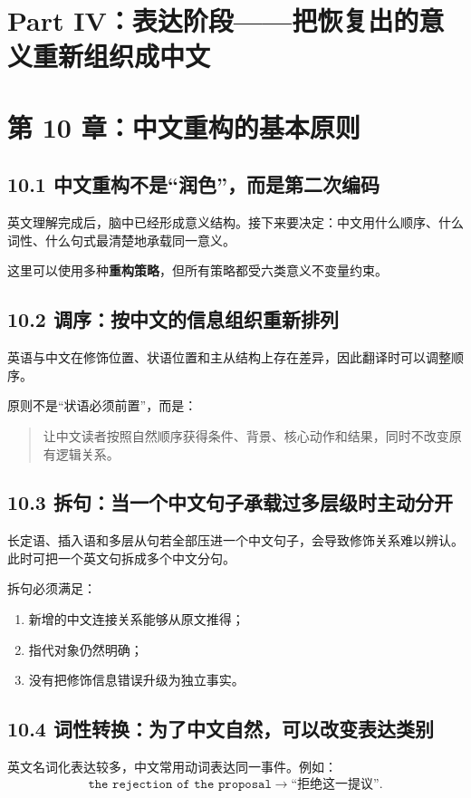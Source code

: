 \documentclass[11pt,a4paper]{ctexart}
\newcommand{\kw}[1]{\textbf{#1}}
\begin{document}
\newpage
\section{Part IV：表达阶段——把恢复出的意义重新组织成中文}

\section{第 10 章：中文重构的基本原则}

\subsection{10.1 中文重构不是“润色”，而是第二次编码}
英文理解完成后，脑中已经形成意义结构。接下来要决定：中文用什么顺序、什么词性、什么句式最清楚地承载同一意义。

这里可以使用多种\kw{重构策略}，但所有策略都受六类意义不变量约束。

\subsection{10.2 调序：按中文的信息组织重新排列}
英语与中文在修饰位置、状语位置和主从结构上存在差异，因此翻译时可以调整顺序。

原则不是“状语必须前置”，而是：
\begin{quote}
让中文读者按照自然顺序获得条件、背景、核心动作和结果，同时不改变原有逻辑关系。
\end{quote}

\subsection{10.3 拆句：当一个中文句子承载过多层级时主动分开}
长定语、插入语和多层从句若全部压进一个中文句子，会导致修饰关系难以辨认。此时可把一个英文句拆成多个中文分句。

拆句必须满足：
\begin{enumerate}
  \item 新增的中文连接关系能够从原文推得；
  \item 指代对象仍然明确；
  \item 没有把修饰信息错误升级为独立事实。
\end{enumerate}

\subsection{10.4 词性转换：为了中文自然，可以改变表达类别}
英文名词化表达较多，中文常用动词表达同一事件。例如：
\[
\texttt{the rejection of the proposal}
\rightarrow
\text{“拒绝这一提议”}.
\]
\end{document}
